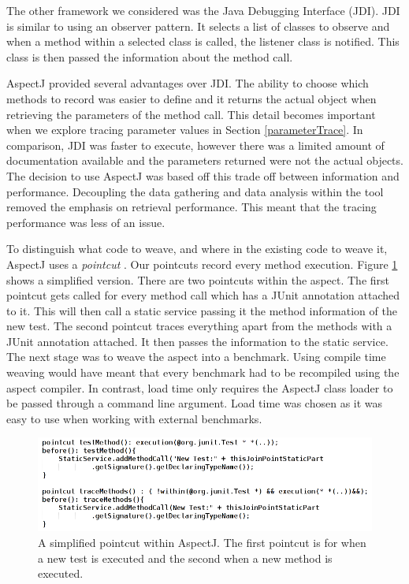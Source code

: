 The other framework we considered was the Java Debugging Interface (JDI). JDI is similar to using an observer pattern. It selects a list of classes to observe and when a method within a selected class is called, the listener class is notified. This class is then passed the information about the method call. 

AspectJ provided several advantages over JDI. The ability to choose which methods to record was easier to define and it returns the actual object when retrieving the parameters of the method call. This detail becomes important when we explore tracing parameter values in Section \ref{parameterTrace}. In comparison, JDI was faster to execute, however there was a limited amount of documentation available and the parameters returned were not the actual objects. The decision to use AspectJ was based off this trade off between information and performance. Decoupling the data gathering and data analysis within the tool removed the emphasis on retrieval performance. This meant that the tracing performance was less of an issue.

To distinguish what code to weave, and where in the existing code to weave it, AspectJ uses a \textit{pointcut} \cite{aspectj}. Our pointcuts record every method execution. Figure \ref{fig:aspectused} shows a simplified version. There are two pointcuts within the aspect. The first pointcut gets called for every method call which has a JUnit \@Test annotation attached to it. This will then call a static service passing it the method information of the new test. The second pointcut traces everything apart from the methods with a JUnit \@Test annotation attached. It then passes the information to the static service. The next stage was to weave the aspect into a benchmark. Using compile time weaving would have meant that every benchmark had to be recompiled using the aspect compiler. In contrast, load time only requires the AspectJ class loader to be passed through a command line argument. Load time was chosen as it was easy to use when working with external benchmarks.

\begin{figure}[h]
\begin{center}
\includegraphics[width = \textwidth]{aspect.png}
\end{center}
\caption{A simplified pointcut within AspectJ. The first pointcut is for when a new test is executed and the second when a new method is executed.}
\label{fig:aspectused}
\end{figure}

